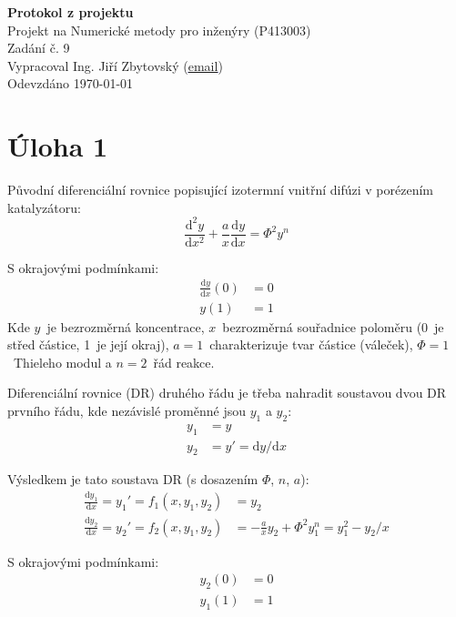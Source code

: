 \documentclass[a4paper,12pt]{article}
\begin{document}
\def\D{\mathrm{d}} %

\begin{center}
\LARGE\textbf{Protokol z projektu} \\
\vspace{2cm}
\large{
	Projekt na Numerické metody pro inženýry (P413003) \\
	Zadání č. 9 \\
	Vypracoval Ing. Jiří Zbytovský (\textcolor{blue}{\underline{\href{mailto:zbytovsi@vscht.cz}{email}}}) \\
	Odevzdáno \today
}
\end{center}

\newpage
\section*{Úloha 1}
Původní diferenciální rovnice popisující izotermní vnitřní difúzi v porézením katalyzátoru:
\begin{equation}
	\frac{\D^2 y}{\D x^2} + \frac{a}{x} \frac{\D y}{\D x} = \Phi^2 y^n
\end{equation}

S okrajovými podmínkami:
\begin{align}
	\frac{\D y}{\D x} (0) &= 0
	\\
	y(1) &= 1
\end{align}
Kde $y$~je bezrozměrná koncentrace, $x$~bezrozměrná souřadnice poloměru (0~je střed částice, 1~je její okraj), $a=1$~charakterizuje tvar částice (váleček), $\Phi=1$~Thieleho modul a $n=2$~řád reakce.

Diferenciální rovnice (DR) druhého řádu je třeba nahradit soustavou dvou DR prvního řádu, kde nezávislé proměnné jsou $y_1$ a $y_2$:
\begin{align}
	y_1 &= y
	\\
	y_2 &= y' = \D y / \D x
\end{align}

Výsledkem je tato soustava DR (s dosazením $\Phi$, $n$, $a$):
\begin{align}
	\frac{\D y_1}{\D x} = y_1' = f_1(x,y_1,y_2) &= y_2
	\\
	\frac{\D y_2}{\D x} = y_2' = f_2(x,y_1,y_2) &= -\frac{a}{x} y_2 + \Phi^2 y_1^n = y_1^2 - y_2 / x
\end{align}

S okrajovými podmínkami:
\begin{align}
	y_2(0) &= 0
	\\
	y_1(1) &= 1
\end{align}
\end{document}
